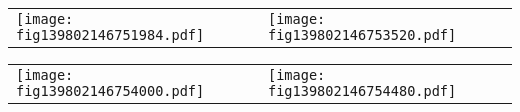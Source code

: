 \documentclass{article}
\newcounter{bmcsexample}
\begin{document}
\begin{bmcsexample}
\begin{center}
\end{center}

\noindent
\begin{tabular}{L{7.5cm}L{7.5cm}}
\texttt{[image: fig139802146751984.pdf]}
 & 
\texttt{[image: fig139802146753520.pdf]}
 \\\end{tabular}

\noindent
\begin{tabular}{L{7.5cm}L{7.5cm}}
\texttt{[image: fig139802146754000.pdf]}
 & 
\texttt{[image: fig139802146754480.pdf]}
 \\\end{tabular}

\end{bmcsexample}
\end{document}
